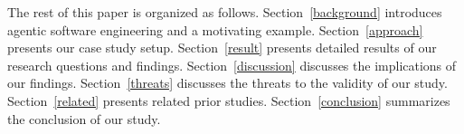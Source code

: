 The rest of this paper is organized as follows. Section~\ref{background} introduces agentic software engineering and a motivating example. Section~\ref{approach} presents our case study setup. Section~\ref{result} presents detailed results of our research questions and findings. Section~\ref{discussion} discusses the implications of our findings. Section~\ref{threats} discusses the threats to the validity of our study. Section~\ref{related} presents related prior studies. Section~\ref{conclusion} summarizes the conclusion of our study.
